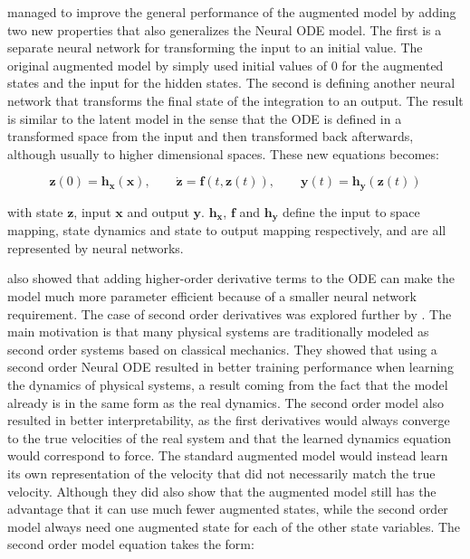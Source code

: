 \documentclass[12pt,a4paper]{book}
\begin{document}
\cite{massaroli2021dissecting} managed to improve the general performance of the augmented model by adding two new properties that also generalizes the Neural ODE model. The first is a separate neural network for transforming the input to an initial value. The original augmented model by \cite{dupont2019augmented} simply used initial values of 0 for the augmented states and the input for the hidden states. The second is defining another neural network that transforms the final state of the integration to an output. The result is similar to the latent model in the sense that the ODE is defined in a transformed space from the input and then transformed back afterwards, although usually to higher dimensional spaces. These new equations becomes:

\begin{equation}
    \bm{z}(0) = \bm{h}_{\bm{x}}(\bm{x}),
    \qquad \dot{\bm{z}} = \bm{f}(t, \bm{z}(t)),
    \qquad \bm{y}(t) = \bm{h}_{\bm{y}}(\bm{z}(t))
\end{equation}

\noindent with state $\bm{z}$, input $\bm{x}$ and output $\bm{y}$. $\bm{h}_{\bm{x}}$, $\bm{f}$ and $\bm{h}_{\bm{y}}$ define the input to space mapping, state dynamics and state to output mapping respectively, and are all represented by neural networks.

\cite{massaroli2021dissecting} also showed that adding higher-order derivative terms to the ODE can make the model much more parameter efficient because of a smaller neural network requirement. The case of second order derivatives was explored further by \cite{sonode}. The main motivation is that many physical systems are traditionally modeled as second order systems based on classical mechanics. They showed that using a second order Neural ODE resulted in better training performance when learning the dynamics of physical systems, a result coming from the fact that the model already is in the same form as the real dynamics. The second order model also resulted in better interpretability, as the first derivatives would always converge to the true velocities of the real system and that the learned dynamics equation would correspond to force. The standard augmented model would instead learn its own representation of the velocity that did not necessarily match the true velocity. Although they did also show that the augmented model still has the advantage that it can use much fewer augmented states, while the second order model always need one augmented state for each of the other state variables. The second order model equation takes the form:
\end{document}
